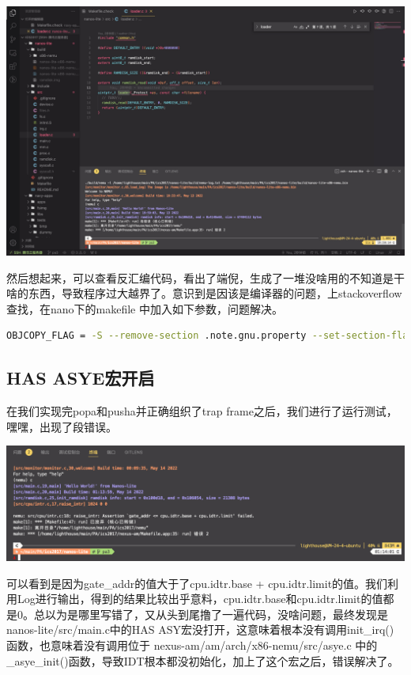 \documentclass[UTF8,a4paper,10pt]{ctexart}
\begin{document}
\begin{center}
  \includegraphics*[scale=0.1]{pic/报错1}
\end{center}

然后想起来，可以查看反汇编代码，看出了端倪，生成了一堆没啥用的不知道是干啥的东西，导致程序过大越界了。意识到是因该是编译器的问题，上stackoverflow查找，在nano下的makefile 中加入如下参数，问题解决。
\begin{lstlisting}[language = bash]
OBJCOPY_FLAG = -S --remove-section .note.gnu.property --set-section-flags .bss=alloc,contents -O binary
\end{lstlisting}

\subsection{HAS ASYE宏开启}
在我们实现完popa和pusha并正确组织了trap frame之后，我们进行了运行测试，嘿嘿，出现了段错误。
\begin{center}
  \includegraphics*[scale = 0.3]{pic/报错2}
\end{center}
可以看到是因为gate\_addr的值大于了cpu.idtr.base + cpu.idtr.limit的值。我们利用Log进行输出，得到的结果比较出乎意料，cpu.idtr.base和cpu.idtr.limit的值都是0。总以为是哪里写错了，又从头到尾撸了一遍代码，没啥问题，最终发现是nanos-lite/src/main.c中的HAS ASY宏没打开，这意味着根本没有调用init\_irq()函数，也意味着没有调用位于 nexus-am/am/arch/x86-nemu/src/asye.c 中的\_asye\_init()函数，导致IDT根本都没初始化，加上了这个宏之后，错误解决了。
\end{document}
